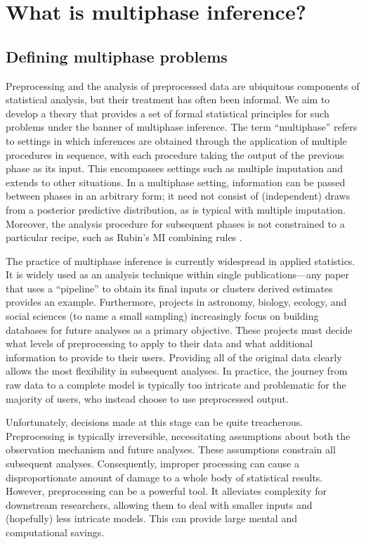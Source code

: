\section{What is multiphase inference?}

\subsection{Defining multiphase problems}
Preprocessing and the analysis of preprocessed data are ubiquitous components of statistical analysis, but their treatment has often been informal.
We aim to develop a theory that provides a set of formal statistical principles for such problems under the banner of multiphase inference.
The term ``multiphase'' refers to settings in which inferences are obtained through the application of multiple procedures in sequence, with each procedure taking the output of the previous phase as its input.
This encompasses settings such as multiple imputation \citep[MI,][]{Rubin1987} and extends to other situations.
In a multiphase setting, information can be passed between phases in an arbitrary form; it need not consist of (independent) draws from a posterior predictive distribution, as is typical with multiple imputation.
Moreover, the analysis procedure for subsequent phases is not constrained to a particular recipe, such as Rubin's MI combining rules \citep{Rubin1987}.

The practice of multiphase inference is currently widespread in applied statistics.
It is widely used as an analysis technique within single publications---any paper that uses a ``pipeline'' to obtain its final inputs or clusters derived estimates provides an example.
Furthermore, projects in astronomy, biology, ecology, and social sciences (to name a small sampling) increasingly focus on building databases for future analyses as a primary objective.
These projects must decide what levels of preprocessing to apply to their data and what additional information to provide to their users.
Providing all of the original data clearly allows the most flexibility in subsequent analyses.
In practice, the journey from raw data to a complete model is typically too intricate and problematic for the majority of users, who instead choose to use preprocessed output.

Unfortunately, decisions made at this stage can be  quite treacherous. Preprocessing is typically irreversible, necessitating assumptions about both the observation mechanism and future analyses. These assumptions constrain all subsequent analyses.
Consequently, improper processing can cause a disproportionate amount of damage to a whole body of statistical results.
However, preprocessing can be a powerful tool.
It alleviates complexity for downstream researchers, allowing them to deal with smaller inputs and (hopefully) less intricate models.
This can provide large mental and computational savings.

